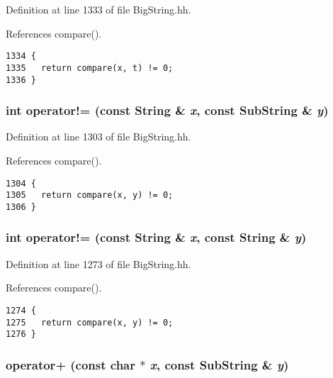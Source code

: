 Definition at line 1333 of file Big\-String.hh.

References compare().



\footnotesize\begin{verbatim}1334 {
1335   return compare(x, t) != 0; 
1336 }
\end{verbatim}\normalsize 
{}
\subsubsection{\setlength{\rightskip}{0pt plus 5cm}int operator!= (const {\bf String} \& {\em x}, const {\bf Sub\-String} \& {\em y})\hspace{0.3cm}{\tt  [inline]}}\label{BigString_8hh_a93}




Definition at line 1303 of file Big\-String.hh.

References compare().



\footnotesize\begin{verbatim}1304 {
1305   return compare(x, y) != 0; 
1306 }
\end{verbatim}\normalsize 
{}
\subsubsection{\setlength{\rightskip}{0pt plus 5cm}int operator!= (const {\bf String} \& {\em x}, const {\bf String} \& {\em y})\hspace{0.3cm}{\tt  [inline]}}\label{BigString_8hh_a87}




Definition at line 1273 of file Big\-String.hh.

References compare().



\footnotesize\begin{verbatim}1274 {
1275   return compare(x, y) != 0; 
1276 }
\end{verbatim}\normalsize 
{}
\subsubsection{ operator+ (const char $\ast$ {\em x}, const {\bf Sub\-String} \& {\em y})\hspace{0.3cm}{\tt  [inline]}}\label{BigString_8hh_a80}





